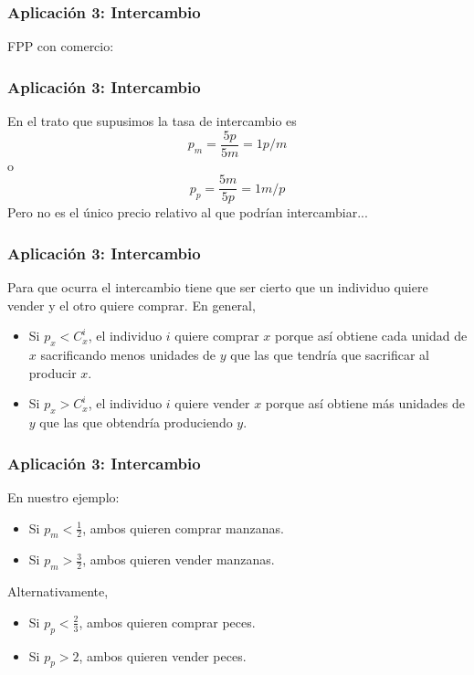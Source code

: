 \documentclass[dvipsnames,table]{beamer}
\newcommand{\peq}[1]{{\scriptscriptstyle{#1}}}
\begin{document}
		\begin{frame}
			\frametitle{Aplicación 3: Intercambio}
			FPP con comercio:
			
						\centering
		\end{frame}

		\begin{frame}
			\frametitle{Aplicación 3: Intercambio}
			En el trato que supusimos la tasa de intercambio es $$p_\peq{m}=\frac{5\peq{p}}{5\peq{m}}=1\peq{p/m}$$ \centering o $$p_\peq{p}=\frac{5\peq{m}}{5\peq{p}}=1\peq{m/p}$$
			Pero no es el único precio relativo al que podrían intercambiar...
		\end{frame}

		\begin{frame}
			\frametitle{Aplicación 3: Intercambio}
			Para que ocurra el intercambio tiene que ser cierto que un individuo quiere vender y el otro quiere comprar. En general,
			\begin{itemize}
				\item Si $p_x<C^\peq{i}_\peq{x}$, el individuo $i$ quiere comprar $x$ porque así obtiene cada unidad de $x$ sacrificando menos unidades de $y$ que las que tendría que sacrificar al producir $x$.
				\item Si $p_x>C^\peq{i}_\peq{x}$, el individuo $i$ quiere vender $x$ porque así obtiene más unidades de $y$ que las que obtendría produciendo $y$.
		 \end{itemize}
		\end{frame}

		\begin{frame}
			\frametitle{Aplicación 3: Intercambio}
			En nuestro ejemplo:
			\begin{itemize}
				\item Si $p_m<\frac{1}{2}$, ambos quieren comprar manzanas.
				\item Si $p_m>\frac{3}{2}$, ambos quieren vender manzanas.
			\end{itemize}
			Alternativamente,
			\begin{itemize}
				\item Si $p_p<\frac{2}{3}$, ambos quieren comprar peces.
				\item Si $p_p>2$, ambos quieren vender peces.
			\end{itemize}
		\end{frame}
\end{document}
